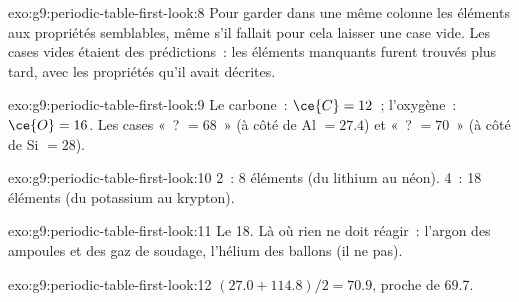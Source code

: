 \begin{solution}{exo:g9:periodic-table-first-look:8}
Pour garder dans une même colonne les éléments aux propriétés
semblables, même s'il fallait pour cela laisser une case vide. Les cases
vides étaient des prédictions~: les éléments manquants furent trouvés
plus tard, avec les propriétés qu'il avait décrites.
\end{solution}

\begin{solution}{exo:g9:periodic-table-first-look:9}
Le carbone~: $\ce{C} = 12$~; l'oxygène~: $\ce{O} = 16$. Les cases
«~? $= 68$~» (à côté de Al $= 27.4$) et «~? $= 70$~» (à côté de
Si $= 28$).
\end{solution}

\begin{solution}{exo:g9:periodic-table-first-look:10}
 2~: 8 éléments (du lithium au néon).  4~: 18 éléments
(du potassium au krypton).
\end{solution}

\begin{solution}{exo:g9:periodic-table-first-look:11}
Le  18. Là où rien ne doit réagir~: l'argon des ampoules et des
gaz de soudage, l'hélium des ballons (il ne  pas).
\end{solution}

\begin{solution}{exo:g9:periodic-table-first-look:12}
$(27.0 + 114.8)/2 = 70.9$, proche de 69.7.
\end{solution}

